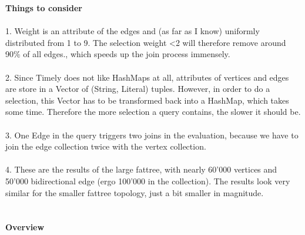 \documentclass[11pt,singlecolumn]{scrartcl}
\begin{document}
\textbf{Things to consider}\\\\
1. Weight is an attribute of the edges and (as far as I know) uniformly distributed from 1 to 9. The selection weight \textless 2 will therefore remove around 90\% of all edges., which speeds up the join process immensely.\\\\
2. Since Timely does not like HashMaps at all, attributes of vertices and edges are store in a Vector of (String, Literal) tuples. However, in order to do a selection, this Vector has to be transformed back into a HashMap, which takes some time. Therefore  the more selection a query contains, the slower it should be.\\\\
3. One Edge in the query triggers two joins in the evaluation,  because we have to join the edge collection twice with the vertex collection.\\\\
4. These are the results of the large fattree, with nearly 60'000 vertices and 50'000 bidirectional edge (ergo 100'000 in the collection). The results look very similar for the smaller fattree topology, just a bit smaller in magnitude.\\\\\\
\textbf{Overview}
\end{document}
